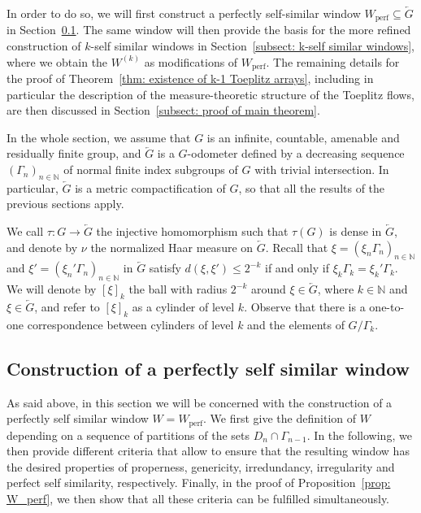 \documentclass[titlepage,reqno,10pt]{amsart}
\theoremstyle{definition}
\begin{document}
In order to do so, we will first construct a perfectly self-similar window $W_\mathrm{perf}\subseteq\overleftarrow{G}$ in Section~\ref{subsect: perfectly self similar windows}. The same window will then provide the basis for the more refined construction of $k$-self similar windows in Section~\ref{subsect: k-self similar windows}, where we obtain the $W^{(k)}$ as modifications of $W_\mathrm{perf}$. The remaining details for the proof of Theorem~\ref{thm: existence of k-1 Toeplitz arrays}, including in particular the description of the measure-theoretic structure of the Toeplitz flows, are then discussed in Section~\ref{subsect: proof of main theorem}.

In the whole section, we assume that $G$ is an infinite, countable, amenable and residually finite group, and $\overleftarrow{G}$ is a $G$-odometer defined by a decreasing sequence $(\Gamma_n)_{n\in\mathbb{N}}$ of normal finite index subgroups of $G$ with trivial intersection. In particular, $\overleftarrow{G}$ is a metric compactification of $G$, so that all the results of the previous sections apply. 

We call $\tau:G\to \overleftarrow{G}$ the injective homomorphism such that $\tau(G)$ is dense in $\overleftarrow{G}$, and denote by $\nu$ the normalized Haar measure on $\overleftarrow{G}$. Recall that $\xi=(\xi_n\Gamma_n)_{n\in\mathbb{N}}$ and $\xi'=(\xi_n'\Gamma_n)_{n\in\mathbb{N}}$  in $\overleftarrow{G}$ satisfy $d(\xi, \xi')\leq 2^{-k}$ if and only if $\xi_k\Gamma_k=\xi_k'\Gamma_k$. We will denote by $[\xi]_k$ the ball with radius $2^{-k}$ around $\xi\in \overleftarrow{G}$, where $k\in\mathbb{N}$ and $\xi\in \overleftarrow{G}$, and refer to $[\xi]_k$ as a cylinder of level $k$. Observe that there is a one-to-one correspondence between cylinders of level $k$ and the elements of $G/\Gamma_k$.

\subsection{Construction of a perfectly self similar window} \label{subsect: perfectly self similar windows}
As said above, in this section we will be concerned with the construction of a perfectly self similar window $W=W_\mathrm{perf}$. We first give the definition of $W$ depending on a sequence of partitions of the sets $D_n\cap \Gamma_{n-1}$. In the following, we then provide different criteria that allow to ensure that the resulting window has the desired properties of properness, genericity, irredundancy, irregularity and perfect self similarity, respectively. 
Finally, in the proof of Proposition~\ref{prop: W_perf}, we then show that all these criteria can be fulfilled simultaneously. \medskip
\end{document}
